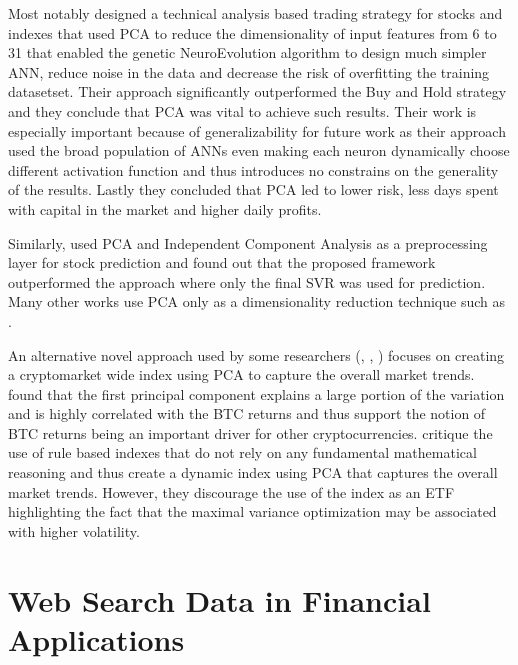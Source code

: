 Most notably \cite{Nadkarni2018} designed a technical analysis based trading 
strategy for stocks and indexes that used \ac{PCA} to reduce the dimensionality
of input features from 6 to 31 that enabled the genetic NeuroEvolution algorithm
to design much simpler \ac{ANN}, reduce noise in the data and decrease 
the risk of overfitting the training datasetset. Their approach significantly 
outperformed the Buy and Hold strategy and they conclude that
\ac{PCA} was vital to achieve such results. Their work is especially important 
because of generalizability for future work as their approach used
the broad population of \ac{ANN}s even making each neuron dynamically
choose different activation function and thus introduces no constrains
on the generality of the results. Lastly they concluded that \ac{PCA} 
led to lower
risk, less days spent with capital in the market and higher daily profits.


Similarly, \cite{Chowdhury2018} used \ac{PCA} and Independent Component 
Analysis as a preprocessing layer for stock prediction and 
found out that the proposed framework outperformed the approach 
where only the final \ac{SVR} was used for prediction. Many
other works use \ac{PCA} only as a dimensionality reduction technique
such as \citep{Toledo2022}.


An alternative novel approach used by some researchers  
(\cite{Shah2021}, \cite{mohsin2021}, \cite{Smales2020})
focuses on creating a cryptomarket wide index using \ac{PCA} to 
capture the overall market trends. \cite{Smales2020} found that 
the first principal component explains a large portion of the variation and 
is highly correlated with the \ac{BTC} returns and thus support the notion
of \ac{BTC} returns being an important driver for other cryptocurrencies.
\cite{Shah2021} critique the use of rule based indexes that do not rely
on any fundamental mathematical reasoning and thus create a dynamic index
using \ac{PCA} that captures the overall market trends. However, they 
discourage the use of the index as an ETF highlighting the fact that the 
maximal variance optimization may be associated with higher volatility.


\section{Web Search Data in Financial Applications}


